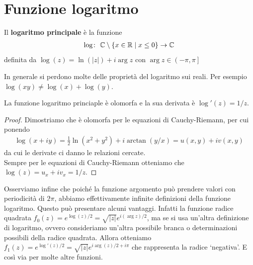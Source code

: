 \section{Funzione logaritmo}
	
	\begin{definition}
		\label{defn:logaritmo-principale}
		Il \textbf{logaritmo principale} è la funzione 
		\begin{equation}
		\begin{aligned}	
			\log \colon\ \mathbb{C} \setminus \{x \in \mathbb{R} \mid x \le 0\} \rightarrow \mathbb{C}
		\end{aligned}
		\end{equation}
		definita da $\log(z) = \ln(|z|) + i\arg z$ con $\arg z \in \left(-\pi,\pi\right]$ 
	\end{definition}

	\begin{remark}
		In generale si perdono molte delle proprietà del logaritmo sui reali. Per esempio $\log(xy) \neq \log(x)+\log(y)$.
	\end{remark}

	\begin{theorem}
		La funzione logaritmo princiaple è olomorfa e la sua derivata è $\log'(z) = 1/z$.
	\end{theorem}
	\begin{proof}
		Dimostriamo che è olomorfa per le equazioni di Cauchy-Riemann, per cui ponendo
		\begin{equation}
		\begin{aligned}
			\log(x+iy) = \frac{1}{2}\ln(x^2 + y^2) + i\arctan(y/x) = u(x,y) + iv(x,y)
		\end{aligned}
		\end{equation}
		da cui le derivate ci danno le relazioni cercate.\\
		
		Sempre per le equazioni di Cauchy-Riemann otteniamo che $\log(z) = u_x + iv_x = 1/z$.
	\end{proof}
	\begin{remark}
		Osserviamo infine che poiché la funzione argomento può prendere valori con periodicità di $2\pi$, abbiamo effettivamente infinite definizioni della funzione logaritmo. Questo può presentare alcuni vantaggi. Infatti la funzione radice quadrata 
		$f_0(z) = e^{\log(z)/2} = \sqrt{|z|}e^{i(\arg z)/2}$, ma se si usa un'altra definizione di logaritmo, ovvero consideriamo un'altra possibile branca o determinazioni possibili della radice quadrata. Allora otteniamo $f_1(z) = e^{\log'(z)/2} = \sqrt{|z|}e^{i\arg(z)/2 + i\pi}$ che rappresenta la radice `negativa'. E così via per molte altre funzioni.
	\end{remark}


